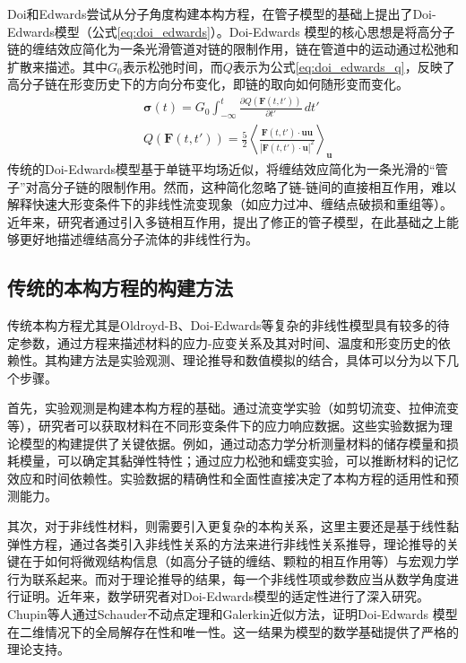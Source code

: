 Doi和Edwards尝试从分子角度构建本构方程，在管子模型的基础上提出了Doi-Edwards模型（公式\eqref{eq:doi_edwards}）。Doi-Edwards 模型的核心思想是将高分子链的缠结效应简化为一条光滑管道对链的限制作用，链在管道中的运动通过松弛和扩散来描述\cite{doi1978dynamics1,doi1978dynamics2,doi1978dynamics3,doi1979dynamics4}。其中$G_0$表示松弛时间，而$Q$表示为公式\eqref{eq:doi_edwards_q}，反映了高分子链在形变历史下的方向分布变化，即链的取向如何随形变而变化。
\begin{align}
   & \boldsymbol{\sigma}(t)  = G_0 \int_{-\infty}^t \frac{\partial Q(\mathbf{F}(t,t'))}{\partial t'} \, dt'    \label{eq:doi_edwards}                                                                  \\
   & Q(\mathbf{F}(t,t'))     = \frac{5}{2} \left\langle \frac{\mathbf{F}(t,t') \cdot \mathbf{u} \mathbf{u}}{|\mathbf{F}(t,t') \cdot \mathbf{u}|^2} \right\rangle_{\mathbf{u}} \label{eq:doi_edwards_q}
\end{align}
传统的Doi-Edwards模型基于单链平均场近似，将缠结效应简化为一条光滑的“管子”对高分子链的限制作用。然而，这种简化忽略了链-链间的直接相互作用，难以解释快速大形变条件下的非线性流变现象（如应力过冲、缠结点破损和重组等）。近年来，研究者通过引入多链相互作用，提出了修正的管子模型，在此基础之上能够更好地描述缠结高分子流体的非线性行为\cite{OConnor1992ConfirmationOT,hassager2010constitutive,chupin2017mathematical}。

\subsection{传统的本构方程的构建方法}
传统本构方程尤其是Oldroyd-B、Doi-Edwards等复杂的非线性模型具有较多的待定参数，通过方程来描述材料的应力-应变关系及其对时间、温度和形变历史的依赖性。其构建方法是实验观测、理论推导和数值模拟的结合，具体可以分为以下几个步骤。

首先，实验观测是构建本构方程的基础。通过流变学实验（如剪切流变、拉伸流变等），研究者可以获取材料在不同形变条件下的应力响应数据。这些实验数据为理论模型的构建提供了关键依据。例如，通过动态力学分析测量材料的储存模量和损耗模量，可以确定其黏弹性特性；通过应力松弛和蠕变实验，可以推断材料的记忆效应和时间依赖性。实验数据的精确性和全面性直接决定了本构方程的适用性和预测能力\cite{alvesNumericalMethodsViscoelastic2021,stadlerWhatAreTypical2014}。

其次，对于非线性材料，则需要引入更复杂的本构关系，这里主要还是基于线性黏弹性方程，通过各类引入非线性关系的方法来进行非线性关系推导，理论推导的关键在于如何将微观结构信息（如高分子链的缠结、颗粒的相互作用等）与宏观力学行为联系起来。而对于理论推导的结果，每一个非线性项或参数应当从数学角度进行证明\cite{zhai2024global}。近年来，数学研究者对Doi-Edwards模型的适定性进行了深入研究。Chupin等人通过Schauder不动点定理和Galerkin近似方法，证明Doi-Edwards 模型在二维情况下的全局解存在性和唯一性\cite{hassager2010constitutive}。这一结果为模型的数学基础提供了严格的理论支持。

